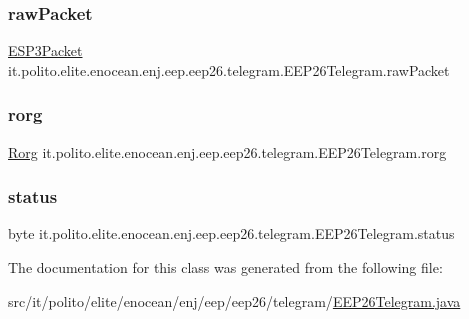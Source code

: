 \subsubsection{\texorpdfstring{raw\+Packet}{rawPacket}}
{\footnotesize\ttfamily \hyperlink{classit_1_1polito_1_1elite_1_1enocean_1_1protocol_1_1serial_1_1v3_1_1network_1_1packet_1_1_e_s_p3_packet}{E\+S\+P3\+Packet} it.\+polito.\+elite.\+enocean.\+enj.\+eep.\+eep26.\+telegram.\+E\+E\+P26\+Telegram.\+raw\+Packet\hspace{0.3cm}{\ttfamily [protected]}}

\hypertarget{classit_1_1polito_1_1elite_1_1enocean_1_1enj_1_1eep_1_1eep26_1_1telegram_1_1_e_e_p26_telegram_ab4b11180d547ae4d2a28b0912267a734}{}\label{classit_1_1polito_1_1elite_1_1enocean_1_1enj_1_1eep_1_1eep26_1_1telegram_1_1_e_e_p26_telegram_ab4b11180d547ae4d2a28b0912267a734} 
\subsubsection{\texorpdfstring{rorg}{rorg}}
{\footnotesize\ttfamily \hyperlink{classit_1_1polito_1_1elite_1_1enocean_1_1enj_1_1eep_1_1_rorg}{Rorg} it.\+polito.\+elite.\+enocean.\+enj.\+eep.\+eep26.\+telegram.\+E\+E\+P26\+Telegram.\+rorg\hspace{0.3cm}{\ttfamily [protected]}}

\hypertarget{classit_1_1polito_1_1elite_1_1enocean_1_1enj_1_1eep_1_1eep26_1_1telegram_1_1_e_e_p26_telegram_a8a7dccc7059eb130ee6812c2953b9687}{}\label{classit_1_1polito_1_1elite_1_1enocean_1_1enj_1_1eep_1_1eep26_1_1telegram_1_1_e_e_p26_telegram_a8a7dccc7059eb130ee6812c2953b9687} 
\subsubsection{\texorpdfstring{status}{status}}
{\footnotesize\ttfamily byte it.\+polito.\+elite.\+enocean.\+enj.\+eep.\+eep26.\+telegram.\+E\+E\+P26\+Telegram.\+status\hspace{0.3cm}{\ttfamily [protected]}}



The documentation for this class was generated from the following file\+:\begin{DoxyCompactItemize}
\item 
src/it/polito/elite/enocean/enj/eep/eep26/telegram/\hyperlink{_e_e_p26_telegram_8java}{E\+E\+P26\+Telegram.\+java}\end{DoxyCompactItemize}
